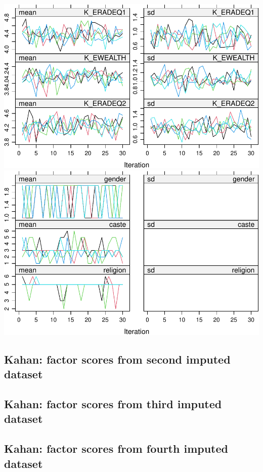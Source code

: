 \documentclass[
]{article}
\begin{document}
\includegraphics{withmice_files/figure-latex/unnamed-chunk-15-4.pdf}
\includegraphics{withmice_files/figure-latex/unnamed-chunk-15-5.pdf}

\hypertarget{kahan-factor-scores-from-second-imputed-dataset}{%
\subsection{Kahan: factor scores from second imputed
dataset}\label{kahan-factor-scores-from-second-imputed-dataset}}

\hypertarget{kahan-factor-scores-from-third-imputed-dataset}{%
\subsection{Kahan: factor scores from third imputed
dataset}\label{kahan-factor-scores-from-third-imputed-dataset}}

\hypertarget{kahan-factor-scores-from-fourth-imputed-dataset}{%
\subsection{Kahan: factor scores from fourth imputed
dataset}\label{kahan-factor-scores-from-fourth-imputed-dataset}}
\end{document}
